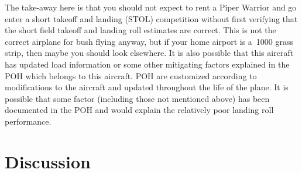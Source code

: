 \documentclass[conf]{new-aiaa}
\begin{document}
The take-away here is that you should not expect to rent a Piper Warrior and go enter a short takeoff and landing (STOL) competition without first verifying that the short field takeoff and landing roll estimates are correct. This is not the correct airplane for bush flying anyway, but if your home airport is a~\SI{1000}{\foot} grass strip, then maybe you should look elsewhere. It is also possible that this aircraft has updated load information or some other mitigating factors explained in the POH which belongs to this aircraft. POH are customized according to modifications to the aircraft and updated throughout the life of the plane. It is possible that some factor (including those not mentioned above) has been documented in the POH and would explain the relatively poor landing roll performance.


\section{Discussion}
\end{document}
